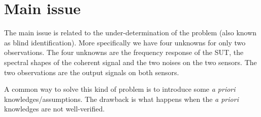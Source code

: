 
 \newpage
\section{Main issue}
The main issue is related to the under-determination of the problem (also known as blind identification). More specifically we have four unknowns for only two observations. The four unknowns are the frequency response of the SUT, the spectral shapes of the coherent signal and the two noises on the two sensors. The two observations are the output signals on both sensors.

A common way to solve this kind of problem is to introduce some {\it a priori} knowledges/assumptions. The drawback is what happens when the {\it a priori} knowledges are not well-verified.

